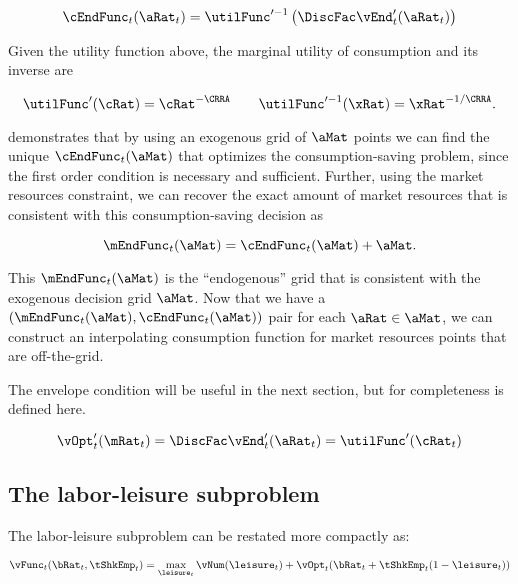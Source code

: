 \documentclass[\econtexRoot/SequentialEGM]{subfiles}
\begin{document}
\begin{equation}
	\cEndFunc_{t}(\aRat_{t}) = \utilFunc'^{-1}\left( \DiscFac \vEnd_{t}'(\aRat_{t})
	\right)
\end{equation}

Given the utility function above, the marginal utility of consumption and its inverse are

\begin{equation}
	\utilFunc'(\cRat) = \cRat^{-\CRRA} \qquad \utilFunc'^{-1}(\xRat) =
	\xRat^{-1/\CRRA}.
\end{equation}

\cite{Carroll2006-wq} demonstrates that by using an exogenous grid of $\aMat$ points we can find the unique
$\cEndFunc_{t}(\aMat)$ that optimizes the consumption-saving problem, since the first order condition is necessary and sufficient.
Further, using the market resources constraint, we can recover the exact amount
of market resources that is consistent with this consumption-saving decision as

\begin{equation}
	\mEndFunc_{t}(\aMat) = \cEndFunc_{t}(\aMat) + \aMat.
\end{equation}

This $\mEndFunc_{t}(\aMat)$ is the ``endogenous'' grid that is consistent
with the exogenous decision grid $\aMat$. Now that we have a
$(\mEndFunc_{t}(\aMat), \cEndFunc_{t}(\aMat))$ pair for each
$\aRat \in \aMat$, we can construct an interpolating consumption function for
market resources points that are off-the-grid.

The envelope condition will be useful in the next section, but for completeness
is defined here.

\begin{equation}
	\vOpt_{t}'(\mRat_{t}) = \DiscFac \vEnd_{t}'(\aRat_{t}) = \utilFunc'(\cRat_{t})
\end{equation}

\subsection{The labor-leisure subproblem}

The labor-leisure subproblem can  be restated more compactly as:

\begin{equation}
	\vFunc_{t}(\bRat_{t}, \tShkEmp_{t}) = \max_{ \leisure_{t}}
	\vNum(\leisure_{t}) + \vOpt_{t}(\bRat_{t} +
	\tShkEmp_{t}(1-\leisure_{t}))
\end{equation}
\end{document}
